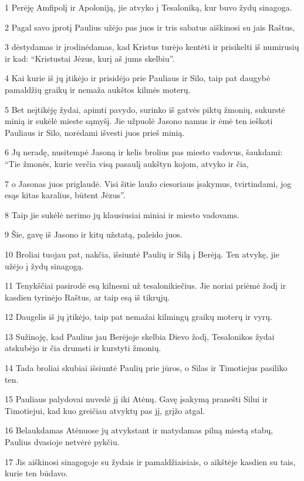 \par 1 Perėję Amfipolį ir Apoloniją, jie atvyko į Tesaloniką, kur buvo žydų sinagoga. 
\par 2 Pagal savo įprotį Paulius užėjo pas juos ir tris sabatus aiškinosi su jais Raštus, 
\par 3 dėstydamas ir įrodinėdamas, kad Kristus turėjo kentėti ir prisikelti iš numirusių ir kad: “Kristus­tai Jėzus, kurį aš jums skelbiu”. 
\par 4 Kai kurie iš jų įtikėjo ir prisidėjo prie Pauliaus ir Silo, taip pat daugybė pamaldžių graikų ir nemaža aukštos kilmės moterų. 
\par 5 Bet neįtikėję žydai, apimti pavydo, surinko iš gatvės piktų žmonių, sukurstė minią ir sukėlė mieste sąmyšį. Jie užpuolė Jasono namus ir ėmė ten ieškoti Pauliaus ir Silo, norėdami išvesti juos prieš minią. 
\par 6 Jų neradę, nusitempė Jasoną ir kelis brolius pas miesto vadovus, šaukdami: “Tie žmonės, kurie verčia visą pasaulį aukštyn kojom, atvyko ir čia, 
\par 7 o Jasonas juos priglaudė. Visi šitie laužo ciesoriaus įsakymus, tvirtindami, jog esąs kitas karalius, būtent Jėzus”. 
\par 8 Taip jie sukėlė nerimo jų klausiusiai miniai ir miesto vadovams. 
\par 9 Šie, gavę iš Jasono ir kitų užstatą, paleido juos. 
\par 10 Broliai tuojau pat, nakčia, išsiuntė Paulių ir Silą į Berėją. Ten atvykę, jie užėjo į žydų sinagogą. 
\par 11 Tenykščiai pasirodė esą kilnesni už tesalonikiečius. Jie noriai priėmė žodį ir kasdien tyrinėjo Raštus, ar taip esą iš tikrųjų. 
\par 12 Daugelis iš jų įtikėjo, taip pat nemažai kilmingų graikų moterų ir vyrų. 
\par 13 Sužinoję, kad Paulius jau Berėjoje skelbia Dievo žodį, Tesalonikos žydai atskubėjo ir čia drumsti ir kurstyti žmonių. 
\par 14 Tada broliai skubiai išsiuntė Paulių prie jūros, o Silas ir Timotiejus pasiliko ten. 
\par 15 Pauliaus palydovai nuvedė jį iki Atėnų. Gavę įsakymą pranešti Silui ir Timotiejui, kad kuo greičiau atvyktų pas jį, grįžo atgal. 
\par 16 Belaukdamas Atėnuose jų atvykstant ir matydamas pilną miestą stabų, Paulius dvasioje netvėrė pykčiu. 
\par 17 Jis aiškinosi sinagogoje su žydais ir pamaldžiaisiais, o aikštėje kasdien su tais, kurie ten būdavo. 
